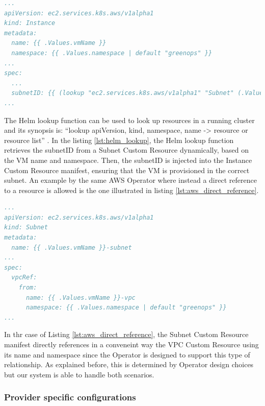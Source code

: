 \begin{lstlisting}[language=yaml, caption={Helm Lookup example: dynamically resolving SubnetIDs}, label={lst:helm_lookup}, float=htpb]
...
apiVersion: ec2.services.k8s.aws/v1alpha1
kind: Instance
metadata:
  name: {{ .Values.vmName }}
  namespace: {{ .Values.namespace | default "greenops" }}
...
spec:
  ...
  subnetID: {{ (lookup "ec2.services.k8s.aws/v1alpha1" "Subnet" (.Values.namespace | default "greenops") (printf "%s-subnet" .Values.vmName)).status.subnetID }}
...
\end{lstlisting}

The Helm lookup function can be used to look up resources in a running cluster and its synopsis is: ``lookup apiVersion, kind, namespace, name -> resource or resource list'' \cite{helm_lookup}.
In the listing \ref{lst:helm_lookup}, the Helm lookup function retrieves the subnetID from a Subnet Custom Resource dynamically, based on the VM name and namespace. Then, the subnetID is injected into the Instance Custom Resource manifest, ensuring that the VM is provisioned in the correct subnet.
An example by the same AWS Operator where instead a direct reference to a resource is allowed is the one illustrated in listing \ref{lst:aws_direct_reference}. \\

\begin{lstlisting}[language=yaml, caption={AWS Operator direct reference example}, label={lst:aws_direct_reference}]
...
apiVersion: ec2.services.k8s.aws/v1alpha1
kind: Subnet
metadata:
  name: {{ .Values.vmName }}-subnet
...
spec:
  vpcRef: 
    from: 
      name: {{ .Values.vmName }}-vpc
      namespace: {{ .Values.namespace | default "greenops" }}
...
\end{lstlisting}

In thr case of Listing \ref{lst:aws_direct_reference}, the Subnet Custom Resource manifest directly references in a conveneint way the VPC Custom Resource using its name and namespace since the Operator is designed to support this type of relationship. As explained before, this is determined by Operator design choices but our system is able to handle both scenarios.

\subsubsection{Provider specific configurations}


